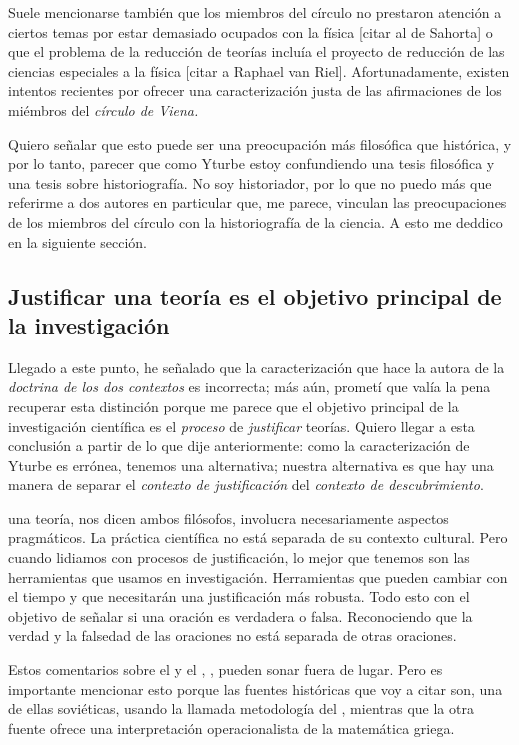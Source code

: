 Suele mencionarse también que los miembros del círculo no prestaron atención a ciertos temas por estar demasiado ocupados con la física [citar al de Sahorta] o que el problema de la reducción de teorías incluía el proyecto de reducción de las ciencias especiales a la física [citar a Raphael van Riel].
Afortunadamente, existen intentos recientes por ofrecer una caracterización justa de las afirmaciones de los miémbros del \emph{círculo de Viena.}

Quiero señalar que esto puede ser una preocupación más filosófica que histórica, y por lo tanto, parecer que como Yturbe \cite{Yturbe1995} estoy confundiendo una tesis filosófica y una tesis sobre historiografía.
No soy historiador, por lo que no puedo más que referirme a dos autores en particular que, me parece, vinculan las preocupaciones de los miembros del círculo con la historiografía de la ciencia.
A esto me deddico en la siguiente sección.


\subsection{Justificar una teoría es el objetivo principal de la investigación}

Llegado a este punto, he señalado que la caracterización que hace la autora de la \emph{doctrina de los dos contextos} es incorrecta; 
más aún, prometí que valía la pena recuperar esta distinción porque me parece que el objetivo principal de la investigación 
científica es el \emph{proceso} de \emph{justificar} teorías.
Quiero llegar a esta conclusión a partir de lo que dije anteriormente: como la caracterización de Yturbe es errónea, tenemos una alternativa; 
nuestra alternativa es que hay una manera de separar el \emph{contexto de justificación} del \emph{contexto de descubrimiento}.




 una teoría, nos dicen ambos filósofos, involucra necesariamente aspectos pragmáticos.
La práctica científica no está separada de su contexto cultural.
Pero cuando lidiamos con procesos de justificación, lo mejor que tenemos son las herramientas que usamos en investigación.
Herramientas que pueden cambiar con el tiempo y que necesitarán una justificación más robusta.
Todo esto con el objetivo de señalar si una oración es verdadera o falsa.
Reconociendo que la verdad y la falsedad de las oraciones no está separada de otras oraciones.

Estos comentarios sobre el  y el ,
, pueden sonar fuera de lugar.
Pero es importante mencionar esto porque las fuentes históricas que voy a citar son, una de ellas soviéticas, usando la llamada metodología del , mientras que la otra fuente ofrece una interpretación operacionalista de la matemática griega.

